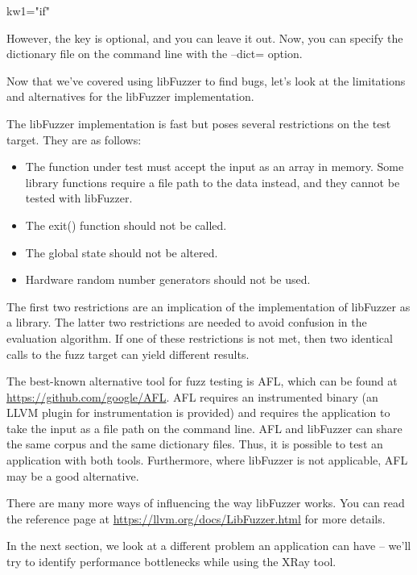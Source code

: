 \begin{shell}
kw1="if"
\end{shell}

However, the key is optional, and you can leave it out. Now, you can specify the dictionary file on the command line with the –dict= option.

Now that we’ve covered using libFuzzer to find bugs, let’s look at the limitations and alternatives for the libFuzzer implementation.


The libFuzzer implementation is fast but poses several restrictions on the test target. They are as follows:

\begin{itemize}
\item
The function under test must accept the input as an array in memory. Some library functions require a file path to the data instead, and they cannot be tested with libFuzzer.

\item
The exit() function should not be called.

\item
The global state should not be altered.

\item
Hardware random number generators should not be used.
\end{itemize}

The first two restrictions are an implication of the implementation of libFuzzer as a library. The latter two restrictions are needed to avoid confusion in the evaluation algorithm. If one of these restrictions is not met, then two identical calls to the fuzz target can yield different results.

The best-known alternative tool for fuzz testing is AFL, which can be found at \url{https://github.com/google/AFL}. AFL requires an instrumented binary (an LLVM plugin for instrumentation is provided) and requires the application to take the input as a file path on the command line. AFL and libFuzzer can share the same corpus and the same dictionary files. Thus, it is possible to test an application with both tools. Furthermore, where libFuzzer is not applicable, AFL may be a good alternative.

There are many more ways of influencing the way libFuzzer works. You can read the reference page at \url{https://llvm.org/docs/LibFuzzer.html} for more details.

In the next section, we look at a different problem an application can have – we’ll try to identify performance bottlenecks while using the XRay tool.




























